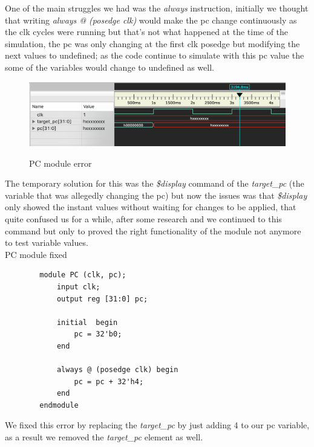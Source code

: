 \documentclass[conference]{IEEEtran}
\begin{document}
        One of the main struggles we had was the \textit{always} instruction, initially we thought that writing \textit{always @ (posedge clk)} would make the pc change continuously as the clk cycles were running but that's not what happened at the time of the simulation, the pc was only changing at the first clk posedge but modifying the next values to undefined; as the code continue to simulate with this pc value the some of the variables would change to undefined as well.
        
        \begin{figure}[h]
            \caption{PC module error}
            \centering
            \includegraphics[scale=0.35]{images/pc_error.png}
            \label{fig:pc-error}
        \end{figure}
        
        The temporary solution for this was the \textit{\$display} command of the \textit{target\_pc} (the variable that was allegedly changing the pc) but now the issues was that \textit{\$display} only showed the instant values without waiting for changes to be applied, that quite confused us for a while, after some research and we continued to this command but only to proved the right functionality of the module not anymore to test variable values.\\
        
        PC module fixed
        \begin{lstlisting}
        module PC (clk, pc);
            input clk;
            output reg [31:0] pc;
            
            initial  begin
                pc = 32'b0;
            end
            
            always @ (posedge clk) begin
        	    pc = pc + 32'h4;
            end
        endmodule
        \end{lstlisting}
        We fixed this error by replacing the \textit{target\_pc} by just adding 4 to our pc variable, as a result we removed the  \textit{target\_pc} element as well.
\end{document}
